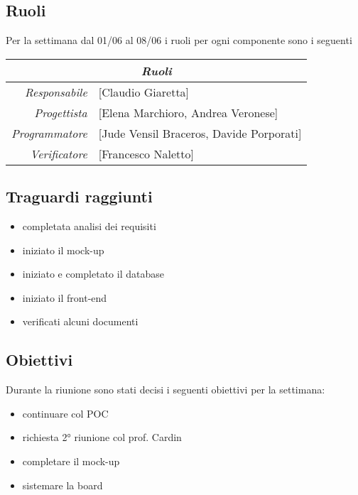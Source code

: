 \documentclass[12pt]{article}
\begin{document}
\subsection{Ruoli}
Per la settimana dal 01/06 al 08/06 i ruoli per ogni componente sono i seguenti
\\
\begin{tabular}{r | l}
    \multicolumn{2}{c}{\textit{Ruoli}}\\
    \hline
        \textit{Responsabile} &
        [Claudio Giaretta]\makecell{}\\
        \textit{Progettista} &
        [Elena Marchioro, Andrea Veronese]\makecell{}\\
        \textit{Programmatore} &
        [Jude Vensil Braceros, Davide Porporati]\makecell{}\\
        \textit{Verificatore} & 
        [Francesco Naletto]\makecell{}\\
\end{tabular}

\subsection{Traguardi raggiunti}
\begin{itemize}
    \item completata analisi dei requisiti
    \item iniziato il mock-up
    \item iniziato e completato il database
    \item iniziato il front-end
    \item verificati alcuni documenti
\end{itemize}

\subsection{Obiettivi}
Durante la riunione sono stati decisi i seguenti obiettivi per la settimana:
\begin{itemize}
    \item continuare col POC
    \item richiesta 2° riunione col prof. Cardin
    \item completare il mock-up
    \item sistemare la board
    
\end{itemize}
\end{document}
